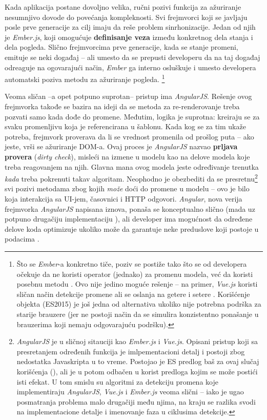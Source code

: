 Kada aplikacija postane dovoljno velika, ručni pozivi funkcija za ažuriranje nesumnjivo dovode do povećanja kompleknosti.
Svi frejmvorci koji se javljaju posle prve generacije za cilj imaju da reše problem sinrhonizacije.
Jedan od njih je \textsl{Ember.js}, koji omogućuje \textbf{definisanje veza} između konkretnog dela stanja i dela pogleda.
Slično frejmvorcima prve generacije, kada se stanje promeni, emituje se neki događaj -- ali umesto da se prepusti developeru da na taj događaj odreaguje na ogovarajući način, \textsl{Ember} ga interno osluškuje i umesto developera automatski poziva metodu za ažuriranje pogleda.%
\footnote{Što se \textsl{Ember}-a konkretno tiče,  poziv se postiže tako što se od developera očekuje da ne koristi operator \code{=} (jednako) za promenu modela, već da koristi posebnu metodu . Ovo nije jedino moguće rešenje -- na primer, \textsl{Vue.js} koristi sličan način detekcije promene ali se oslanja na getere i setere \cite{matt:vue-code}. Korišćenje  objekta (ES2015) je još jedna od alternativa ukoliko nije potrebna podrška za starije brauzere (jer ne postoji način da se simulira konzistentno ponašanje u brauzerima koji nemaju odgovarajuću podršku).}

Veoma sličan --a opet potpuno suprotan-- pristup ima \textsl{AngularJS}.
Rešenje ovog frejmvorka takođe se bazira na ideji da se metoda za re-renderovanje treba pozvati samo kada dođe do promene.
Međutim, logika je suprotna: kreiraju se  za svaku promenljivu koja je referencirana u šablonu.
Kada kog se za tim ukaže potreba, frejmvork proverava da li se vrednost promenila od prošlog puta -- ako jeste, vrši se ažuriranje DOM-a.
Ovaj proces je \textsl{AngularJS} nazvao \textbf{prljava provera} (\textsl{dirty check}), misleći na izmene u modelu kao na  delove modela koje treba  reagovanjem na njih.
Glavna mana ovog modela jeste određivanje trenutka \emph{kada} treba pokrenuti takav algoritam.
Neophodno je obezbediti da se presretnu\footnote{\textsl{AngularJS} je u sličnoj sitauciji kao \textsl{Ember.js} i \textsl{Vue.js}. Opisani pristup koji  sa presretanjem određenih funkcija je imlpementacioni detalj i postoji zbog nedostatka Javaskripta u to vreme. Postojao je ES predlog baš za ovaj slučaj korišćenja (), ali je u potom odbačen u korist predloga  kojim se može postići isti efekat. U tom smislu su algoritmi za detekciju promena koje implementiraju \textsl{AngularJS}, \textsl{Vue.js} i \textsl{Ember.js} veoma slični -- iako je ugao posmatranja problema malo drugačiji među njima, na kraju se razlika svodi na implementacione detalje i imenovanje faza u ciklusima detekcije.} svi pozivi metodama zbog kojih \textit{može} doći do promene u modelu -- ovo je bilo koja interakcija sa UI-jem, časovnici i HTTP odgovori.
\textsl{Angular}, nova verija frejmvorka \textsl{AngularJS} napisana iznova, ponaša se konceptualno slično (mada uz potpuno drugačiju implementaciju \cite{ng-uni:cd, milosz:ng-cd}), ali developer ima mogućnost da određene delove koda optimizuje ukoliko može da garantuje neke preduslove koji postoje u podacima \cite{savkin:cd, thoughtram:cd}.

